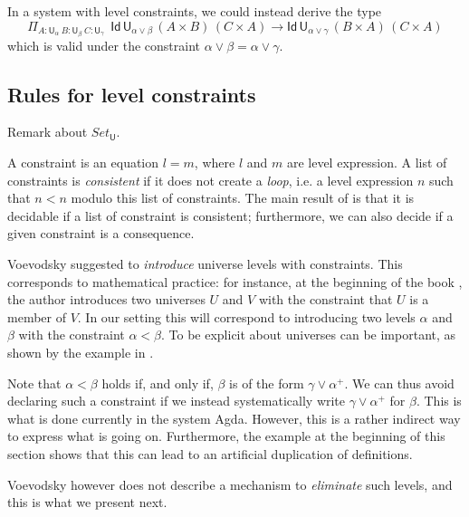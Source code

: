\documentclass[11pt,a4paper]{article}
\theoremstyle{definition}
\newcommand{\Id}{\mathsf{Id}}
\newcommand{\UU}{\mathsf{U}}
\newcommand{\Level}{\mathsf{Level}}
\newcommand{\Constraint}{\mathsf{Constraint}}
\begin{document}
In a system with level constraints, we could instead derive the type
$$
    \Pi_{A:\UU_\alpha~{B}:{\UU_\beta}~{C}:{\UU_\gamma}}
    {~~\Id\,\UU_{\alpha \vee \beta}\, (A\times B)\,(C \times A)
    \to \Id\,\UU_{\alpha \vee \gamma}\, (B\times A)\,(C \times A)}
$$
which is valid under the constraint
$
\alpha \vee \beta = \alpha \vee \gamma.
$

\subsection{Rules for level constraints}%

{\color{red}
  Remark about $Set_\UU$.}

A constraint is an equation $l = m$, where $l$ and $m$ are level expression.
A list of constraints is {\em consistent} if it does not create a {\em loop}, i.e.
a level expression $n$ such  that $n<n$ modulo this list of constraints.
The main result of \cite{bezem-coquand:lattices} is that it is decidable if a list
of constraint is consistent; furthermore, we can also decide if a given constraint
is a consequence.

Voevodsky \cite{VV} suggested to {\em introduce} universe levels with constraints. This corresponds
to mathematical practice: for instance, at the beginning of the book \cite{giraud:cohom-non-abel},
the author introduces two universes $U$ and $V$ with the constraint that $U$ is a member of $V$.
In our setting this will correspond to introducing two levels $\alpha$ and $\beta$ with the
constraint $\alpha<\beta$. To be explicit about universes can be important, as shown by the
example in \cite{chambert-loir:universes-matter,waterhouse:sheaves}.

Note that $\alpha<\beta$ holds if, and only if, $\beta$ is of the form $\gamma\vee\alpha^+$. We can thus
avoid declaring such a constraint if we instead systematically write $\gamma\vee\alpha^+$ for $\beta$.
This is what is done currently in the system Agda. However, this is a rather indirect way to express what is
going on. Furthermore, the example at the beginning of this section shows that this can lead to an artificial duplication
of definitions.

Voevodsky however does not describe a mechanism to {\em eliminate}
such levels, and this is what we present next.

\medskip

\end{document}
